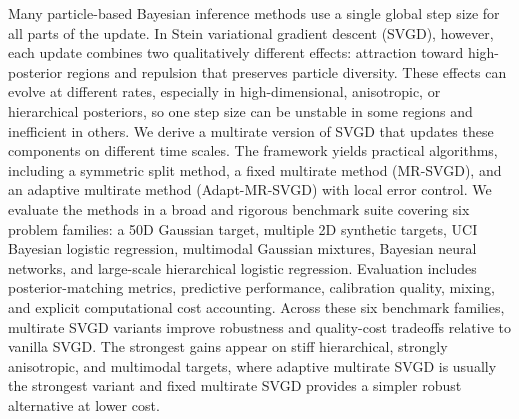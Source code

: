 Many particle-based Bayesian inference methods use a single global step size
for all parts of the update. In Stein variational gradient descent (SVGD),
however, each update combines two qualitatively different effects: attraction
toward high-posterior regions and repulsion that preserves particle diversity.
These effects can evolve at different rates, especially in high-dimensional,
anisotropic, or hierarchical posteriors, so one step size can be unstable in
some regions and inefficient in others. We derive a multirate
version of SVGD that updates these components on different time scales. The
framework yields practical algorithms, including a symmetric split method, a
fixed multirate method (MR-SVGD), and an adaptive multirate method
(Adapt-MR-SVGD) with local error control. We evaluate the methods in a broad
and rigorous benchmark suite covering six problem families: a 50D Gaussian
target, multiple 2D synthetic targets, UCI Bayesian logistic regression,
multimodal Gaussian mixtures, Bayesian neural networks, and large-scale
hierarchical logistic regression. Evaluation includes posterior-matching metrics,
predictive performance, calibration quality, mixing, and explicit computational 
cost accounting.
Across these six benchmark families, multirate SVGD variants
improve robustness and quality-cost tradeoffs relative to vanilla SVGD. The
strongest gains appear on stiff hierarchical, strongly anisotropic, and
multimodal targets, where adaptive multirate SVGD is usually the strongest
variant and fixed multirate SVGD provides a simpler robust alternative at
lower cost.
